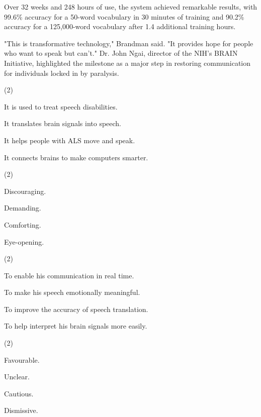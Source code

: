 \documentclass{英语试卷}
\begin{document}
\par Over 32 weeks and 248 hours of use, the system achieved remarkable results, with 99.6\% accuracy for a 50-word vocabulary in 30 minutes of training and 90.2\% accuracy for a 125,000-word vocabulary after 1.4 additional training hours.\par
\par "This is transformative technology," Brandman said. "It provides hope for people who want to speak but can't." Dr. John Ngai, director of the NIH's BRAIN Initiative, highlighted the milestone as a major step in restoring communication for individuals locked in by paralysis.\par
{}
\begin{choices}(2)
  \item It is used to treat speech disabilities.
  \item It translates brain signals into speech.
  \item It helps people with ALS move and speak.
  \item It connects brains to make computers smarter.
\end{choices}
\begin{choices}(2)
  \item Discouraging.
  \item Demanding.
  \item Comforting.
  \item Eye-opening.
\end{choices}
\begin{choices}(2)
  \item To enable his communication in real time.
  \item To make his speech emotionally meaningful.
  \item To improve the accuracy of speech translation.
  \item To help interpret his brain signals more easily.
\end{choices}
\begin{choices}(2)
  \item Favourable.
  \item Unclear.
  \item Cautious.
  \item Dismissive.
\end{choices}
\end{document}
